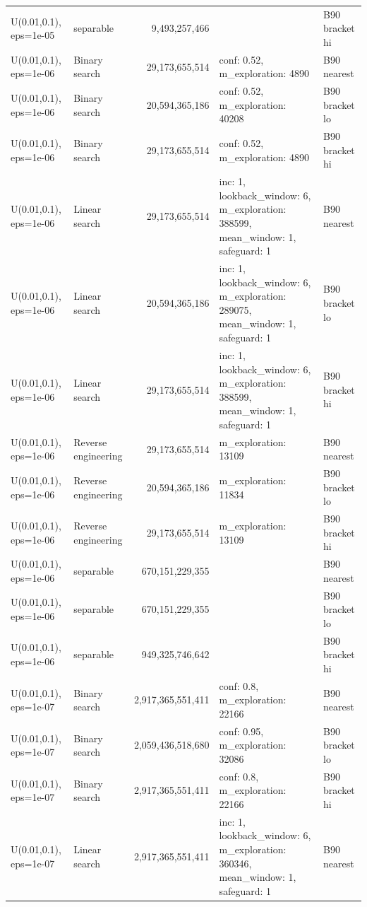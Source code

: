 \begin{tabular}{llrll}
U(0.01,0.1), eps=1e-05 & separable & 9,493,257,466 &  & B90 bracket hi \\
U(0.01,0.1), eps=1e-06 & Binary search & 29,173,655,514 & conf: 0.52, m\_exploration: 4890 & B90 nearest \\
U(0.01,0.1), eps=1e-06 & Binary search & 20,594,365,186 & conf: 0.52, m\_exploration: 40208 & B90 bracket lo \\
U(0.01,0.1), eps=1e-06 & Binary search & 29,173,655,514 & conf: 0.52, m\_exploration: 4890 & B90 bracket hi \\
U(0.01,0.1), eps=1e-06 & Linear search & 29,173,655,514 & inc: 1, lookback\_window: 6, m\_exploration: 388599, mean\_window: 1, safeguard: 1 & B90 nearest \\
U(0.01,0.1), eps=1e-06 & Linear search & 20,594,365,186 & inc: 1, lookback\_window: 6, m\_exploration: 289075, mean\_window: 1, safeguard: 1 & B90 bracket lo \\
U(0.01,0.1), eps=1e-06 & Linear search & 29,173,655,514 & inc: 1, lookback\_window: 6, m\_exploration: 388599, mean\_window: 1, safeguard: 1 & B90 bracket hi \\
U(0.01,0.1), eps=1e-06 & Reverse engineering & 29,173,655,514 & m\_exploration: 13109 & B90 nearest \\
U(0.01,0.1), eps=1e-06 & Reverse engineering & 20,594,365,186 & m\_exploration: 11834 & B90 bracket lo \\
U(0.01,0.1), eps=1e-06 & Reverse engineering & 29,173,655,514 & m\_exploration: 13109 & B90 bracket hi \\
U(0.01,0.1), eps=1e-06 & separable & 670,151,229,355 &  & B90 nearest \\
U(0.01,0.1), eps=1e-06 & separable & 670,151,229,355 &  & B90 bracket lo \\
U(0.01,0.1), eps=1e-06 & separable & 949,325,746,642 &  & B90 bracket hi \\
U(0.01,0.1), eps=1e-07 & Binary search & 2,917,365,551,411 & conf: 0.8, m\_exploration: 22166 & B90 nearest \\
U(0.01,0.1), eps=1e-07 & Binary search & 2,059,436,518,680 & conf: 0.95, m\_exploration: 32086 & B90 bracket lo \\
U(0.01,0.1), eps=1e-07 & Binary search & 2,917,365,551,411 & conf: 0.8, m\_exploration: 22166 & B90 bracket hi \\
U(0.01,0.1), eps=1e-07 & Linear search & 2,917,365,551,411 & inc: 1, lookback\_window: 6, m\_exploration: 360346, mean\_window: 1, safeguard: 1 & B90 nearest \\

\end{tabular}
